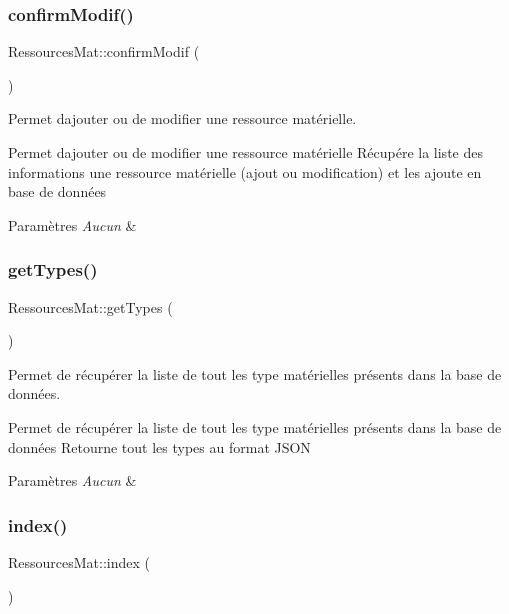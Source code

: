 \subsubsection{\texorpdfstring{confirm\+Modif()}{confirmModif()}}
{\footnotesize\ttfamily Ressources\+Mat\+::confirm\+Modif (\begin{DoxyParamCaption}{ }\end{DoxyParamCaption})}



Permet d\textquotesingle{}ajouter ou de modifier une ressource matérielle. 

Permet d\textquotesingle{}ajouter ou de modifier une ressource matérielle Récupére la liste des informations une ressource matérielle (ajout ou modification) et les ajoute en base de données 
\begin{DoxyParams}{Paramètres}
{\em Aucun} & \\
\hline
\end{DoxyParams}
\mbox{\label{class_ressources_mat_a47413435e6b3bcc8c7ed5f54360246ce}} 
\subsubsection{\texorpdfstring{get\+Types()}{getTypes()}}
{\footnotesize\ttfamily Ressources\+Mat\+::get\+Types (\begin{DoxyParamCaption}{ }\end{DoxyParamCaption})}



Permet de récupérer la liste de tout les type matérielles présents dans la base de données. 

Permet de récupérer la liste de tout les type matérielles présents dans la base de données Retourne tout les types au format J\+S\+ON 
\begin{DoxyParams}{Paramètres}
{\em Aucun} & \\
\hline
\end{DoxyParams}
\mbox{\label{class_ressources_mat_acc06aac7c0d66876993fc0c98b957a03}} 
\subsubsection{\texorpdfstring{index()}{index()}}
{\footnotesize\ttfamily Ressources\+Mat\+::index (\begin{DoxyParamCaption}{ }\end{DoxyParamCaption})}




